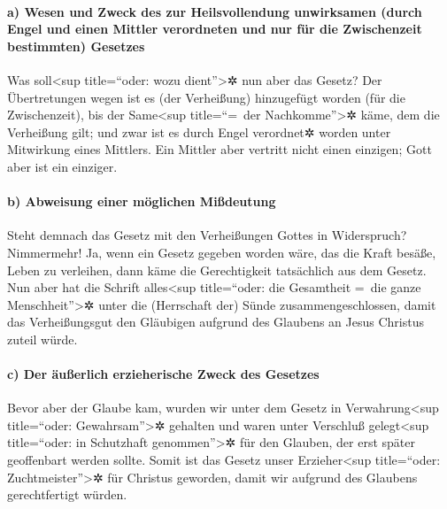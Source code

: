 \hypertarget{a-wesen-und-zweck-des-zur-heilsvollendung-unwirksamen-durch-engel-und-einen-mittler-verordneten-und-nur-fuxfcr-die-zwischenzeit-bestimmten-gesetzes}{%
\paragraph{a) Wesen und Zweck des zur Heilsvollendung unwirksamen (durch
Engel und einen Mittler verordneten und nur für die Zwischenzeit
bestimmten)
Gesetzes}\label{a-wesen-und-zweck-des-zur-heilsvollendung-unwirksamen-durch-engel-und-einen-mittler-verordneten-und-nur-fuxfcr-die-zwischenzeit-bestimmten-gesetzes}}

 Was soll\textless sup title=``oder: wozu
dient''\textgreater✲ nun aber das Gesetz? Der Übertretungen wegen ist es
(der Verheißung) hinzugefügt worden (für die Zwischenzeit), bis der
Same\textless sup title=``=~der Nachkomme''\textgreater✲ käme, dem die
Verheißung gilt; und zwar ist es durch Engel verordnet✲ worden unter
Mitwirkung eines Mittlers.  Ein Mittler aber vertritt
nicht einen einzigen; Gott aber ist ein einziger.

\hypertarget{b-abweisung-einer-muxf6glichen-miuxdfdeutung}{%
\paragraph{b) Abweisung einer möglichen
Mißdeutung}\label{b-abweisung-einer-muxf6glichen-miuxdfdeutung}}

 Steht demnach das Gesetz mit den Verheißungen Gottes in
Widerspruch? Nimmermehr! Ja, wenn ein Gesetz gegeben worden wäre, das
die Kraft besäße, Leben zu verleihen, dann käme die Gerechtigkeit
tatsächlich aus dem Gesetz.  Nun aber hat die Schrift
alles\textless sup title=``oder: die Gesamtheit =~die ganze
Menschheit''\textgreater✲ unter die (Herrschaft der) Sünde
zusammengeschlossen, damit das Verheißungsgut den Gläubigen aufgrund des
Glaubens an Jesus Christus zuteil würde.

\hypertarget{c-der-uxe4uuxdferlich-erzieherische-zweck-des-gesetzes}{%
\paragraph{c) Der äußerlich erzieherische Zweck des
Gesetzes}\label{c-der-uxe4uuxdferlich-erzieherische-zweck-des-gesetzes}}

 Bevor aber der Glaube kam, wurden wir unter dem Gesetz
in Verwahrung\textless sup title=``oder: Gewahrsam''\textgreater✲
gehalten und waren unter Verschluß gelegt\textless sup title=``oder: in
Schutzhaft genommen''\textgreater✲ für den Glauben, der erst später
geoffenbart werden sollte.  Somit ist das Gesetz unser
Erzieher\textless sup title=``oder: Zuchtmeister''\textgreater✲ für
Christus geworden, damit wir aufgrund des Glaubens gerechtfertigt
würden.

